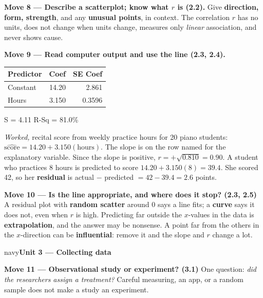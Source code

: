 \documentclass[12pt]{article}
\newcommand{\sghead}[2][10]{%
  \vspace{0.13in}
  \boxguard[#1]
  \begin{headlinebox}{navy}\color{white}\bfseries\small #2\end{headlinebox}
  \vspace{0.09in}}
\begin{document}
\vspace{5pt}
\textbf{Move 8 --- Describe a scatterplot; know what $r$ is (2.2).} Give \textbf{direction, form,
strength}, and any \textbf{unusual points}, in context. The correlation $r$ has no units, does
not change when units change, measures only \emph{linear} association, and never shows cause.

\vspace{3pt}
\boxguard[11]
\textbf{Move 9 --- Read computer output and use the line (2.3, 2.4).}

\vspace{2pt}
\noindent\begin{minipage}[c]{0.40\linewidth}\centering\scriptsize\ttfamily
\begin{tabular}{@{} l r r @{}}
Predictor & Coef & SE Coef \\ \hline
Constant & 14.20 & 2.861 \\
Hours & 3.150 & 0.3596 \\
\end{tabular}\par
\vspace{2pt}
S = 4.11 \quad R-Sq = 81.0\%
\end{minipage}\hfill
\begin{minipage}[c]{0.57\linewidth}\raggedright
\emph{Worked,} recital score from weekly practice hours for 20 piano students:
$\widehat{\text{score}} = 14.20 + 3.150(\text{hours})$. The slope is on the row named for the
explanatory variable. Since the slope is positive, $r = +\sqrt{0.810} = 0.90$. A student who
practices 8 hours is predicted to score $14.20 + 3.150(8) = 39.4$. She scored 42, so her
\textbf{residual} is actual $-$ predicted $= 42 - 39.4 = 2.6$ points.
\end{minipage}

\vspace{5pt}
\textbf{Move 10 --- Is the line appropriate, and where does it stop? (2.3, 2.5)} A residual plot
with \textbf{random scatter} around 0 says a line fits; a \textbf{curve} says it does not, even
when $r$ is high. Predicting far outside the $x$-values in the data is \textbf{extrapolation},
and the answer may be nonsense. A point far from the others in the $x$-direction can be
\textbf{influential}: remove it and the slope and $r$ change a lot.

\normalsize
\sghead{Unit 3 --- Collecting data}

\small
\textbf{Move 11 --- Observational study or experiment? (3.1)} One question: \emph{did the
researchers assign a treatment?} Careful measuring, an app, or a random sample does not make a
study an experiment.
\end{document}
